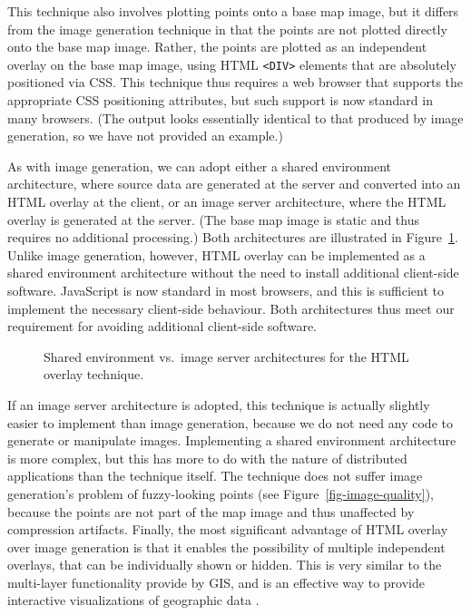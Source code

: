\documentclass[acmtocl,acmnow]{acmtrans2m}
\begin{document}
This technique also involves plotting points onto a base map image, but
it differs from the image generation technique in that the points are
not plotted directly onto the base map image. Rather, the points are
plotted as an independent overlay on the base map image, using HTML
\verb|<DIV>| elements that are absolutely positioned via CSS. This
technique thus requires a web browser that supports the appropriate CSS
positioning attributes, but such support is now standard in many
browsers. (The output looks essentially identical to that produced by
image generation, so we have not provided an example.)

As with image generation, we can adopt either a shared environment
architecture, where source data are generated at the server and
converted into an HTML overlay at the client, or an image server
architecture, where the HTML overlay is generated at the server. (The
base map image is static and thus requires no additional processing.)
Both architectures are illustrated in
Figure~\ref{fig-html-architectures}. Unlike image generation, however,
HTML overlay can be implemented as a shared environment architecture
without the need to install additional client-side software. JavaScript
is now standard in most browsers, and this is sufficient to implement
the necessary client-side behaviour. Both architectures thus meet our
requirement for avoiding additional client-side software.


\begin{figure}
	\caption{Shared environment vs.\ image server architectures for the
	HTML overlay technique.}
	\label{fig-html-architectures}
\end{figure}


If an image server architecture is adopted, this technique is actually
slightly easier to implement than image generation, because we do not
need any code to generate or manipulate images. Implementing a shared
environment architecture is more complex, but this has more to do with
the nature of distributed applications than the technique itself. The
technique does not suffer image generation's problem of fuzzy-looking
points (see Figure~\ref{fig-image-quality}), because the points are not
part of the map image and thus unaffected by compression artifacts.
Finally, the most significant advantage of HTML overlay over image
generation is that it enables the possibility of multiple independent
overlays, that can be individually shown or hidden. This is very similar
to the multi-layer functionality provide by GIS, and is an effective way
to provide interactive visualizations of geographic data
\cite{Wood-J-1996-vis,MacE-AM-1998-GIS}.
\end{document}
